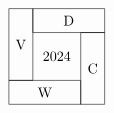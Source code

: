 \documentclass[10pt]{article}
\begin{document}
\begin{align*}%
\begin{tikzpicture}[scale=0.6]
\draw (0,1) rectangle (1,4) node[midway]{V};
\draw (1,3) rectangle (4,4) node[midway]{D};
\draw (3,0) rectangle (4,3) node[midway]{C};
\draw (0,0) rectangle (3,1) node[midway]{W};
\node at (2,2) {2024};
\end{tikzpicture}\end{align*}
\end{document}
